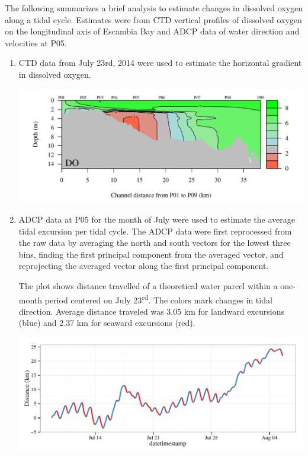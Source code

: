 \documentclass[letterpaper,12pt]{article}\usepackage[]{graphicx}\usepackage[]{color}
\makeatletter
\def\maxwidth{ %
  \ifdim\Gin@nat@width>\linewidth
    \linewidth
  \else
    \Gin@nat@width
  \fi
}
\makeatother
\begin{document}
The following summarizes a brief analysis to estimate changes in dissolved oxygen along a tidal cycle.  Estimates were from CTD vertical profiles of dissolved oxygen on the longitudinal axis of Escambia Bay and ADCP data of water direction and velocities at P05.  
\begin{enumerate}
\item{
CTD data from July 23rd, 2014 were used to estimate the horizontal gradient in dissolved oxygen.


{\centering \includegraphics[width=\textwidth]{figs/unnamed-chunk-1-1} 

}



}
\item{
ADCP data at P05 for the month of July were used to estimate the average tidal excursion per tidal cycle.  The ADCP data were first reprocessed from the raw data by averaging the north and south vectors for the lowest three bins, finding the first principal component from the averaged vector, and reprojecting the averaged vector along the first principal component.  


The plot shows distance travelled of a theoretical water parcel within a one-month period centered on July 23\textsuperscript{rd}.  The colors mark changes in tidal direction.  Average distance traveled was 3.05 km for landward excursions (blue) and 2.37 km for seaward excursions (red).


{\centering \includegraphics[width=\maxwidth]{figs/unnamed-chunk-3-1} 

}}
\end{enumerate}
\end{document}
